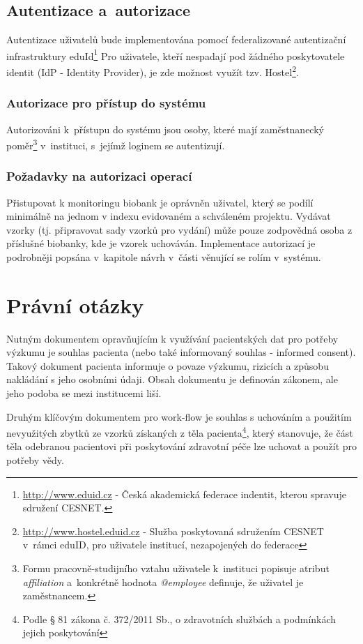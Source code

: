 \subsection{Autentizace a~autorizace}
Autentizace uživatelů bude implementována pomocí federalizované autentizační infrastruktury eduId\footnote{
\url{http://www.eduid.cz} - Česká akademická federace indentit, kterou spravuje sdružení CESNET.} Pro uživatele, kteří nespadají pod žádného poskytovatele identit (IdP - Identity Provider), je zde možnost využít tzv. Hostel\footnote{\url{http://www.hostel.eduid.cz} - Služba poskytovaná sdružením CESNET v~rámci eduID, pro uživatele institucí, nezapojených do federace}. 
\subsubsection{Autorizace pro přístup do systému}
Autorizováni k~přístupu do systému jsou osoby, které mají zaměstnanecký poměr\footnote{Formu pracovně-studijního vztahu uživatele k~instituci popisuje atribut \textit{affiliation} a~konkrétně hodnota \textit{@employee} definuje, že uživatel je zaměstnancem.} v~instituci, s~jejímž loginem se autentizují.
\subsubsection{Požadavky na autorizaci operací}
Přistupovat k monitoringu biobank je oprávněn uživatel, který se podílí minimálně na jednom v indexu evidovaném a schváleném projektu.
Vydávat vzorky (tj. připravovat sady vzorků pro vydání) může pouze zodpovědná osoba z příslušné biobanky, kde je vzorek uchováván.
Implementace autorizací je podrobněji popsána v~kapitole návrh v~části věnující se rolím v~systému.

\section{Právní otázky}
Nutným dokumentem opravňujícím k využívání pacientských dat pro potřeby výzkumu je souhlas pacienta (nebo také informovaný souhlas - informed consent). Takový dokument pacienta informuje o povaze výzkumu, rizicích a způsobu nakládání s jeho osobními údaji. Obsah dokumentu je definován zákonem, ale jeho podoba se mezi institucemi liší. 

Druhým klíčovým dokumentem pro work-flow je souhlas s uchováním a použitím nevyužitých zbytků ze vzorků získaných z těla pacienta\footnote{Podle § 81 zákona č. 372/2011 Sb., o zdravotních službách a podmínkách jejich poskytování}, který stanovuje, že část těla odebranou pacientovi při poskytování zdravotní péče lze uchovat a použít pro potřeby vědy. 

